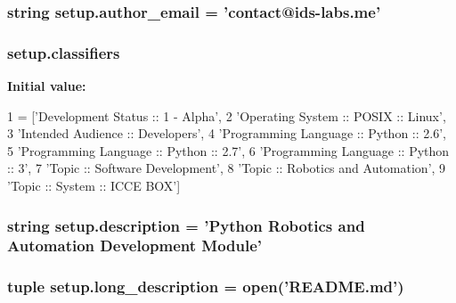\subsubsection[{author\+\_\+email}]{\setlength{\rightskip}{0pt plus 5cm}string setup.\+author\+\_\+email = 'contact@ids-\/labs.\+me'}\label{namespacesetup_aa144ac52ed417d5c65d7377e0e75673e}
\hypertarget{namespacesetup_abe96a9c38c1c61f9f0fdb002c482f785}{}
\subsubsection[{classifiers}]{\setlength{\rightskip}{0pt plus 5cm}setup.\+classifiers}\label{namespacesetup_abe96a9c38c1c61f9f0fdb002c482f785}
{\bfseries Initial value\+:}
\begin{DoxyCode}
1 = [\textcolor{stringliteral}{'Development Status :: 1 - Alpha'},
2                \textcolor{stringliteral}{'Operating System :: POSIX :: Linux'},
3                \textcolor{stringliteral}{'Intended Audience :: Developers'},
4                \textcolor{stringliteral}{'Programming Language :: Python :: 2.6'},
5                \textcolor{stringliteral}{'Programming Language :: Python :: 2.7'},
6                \textcolor{stringliteral}{'Programming Language :: Python :: 3'},
7                \textcolor{stringliteral}{'Topic :: Software Development'},
8                \textcolor{stringliteral}{'Topic :: Robotics and Automation'},
9                \textcolor{stringliteral}{'Topic :: System :: ICCE BOX'}]
\end{DoxyCode}
\hypertarget{namespacesetup_ade8aa54df2083113a10326ea2fe7934b}{}
\subsubsection[{description}]{\setlength{\rightskip}{0pt plus 5cm}string setup.\+description = 'Python Robotics and Automation Development Module'}\label{namespacesetup_ade8aa54df2083113a10326ea2fe7934b}
\hypertarget{namespacesetup_acaf26e8be236d4bfa129f4c0f4f53baf}{}
\subsubsection[{long\+\_\+description}]{\setlength{\rightskip}{0pt plus 5cm}tuple setup.\+long\+\_\+description = open('R\+E\+A\+D\+M\+E.\+md')}\label{namespacesetup_acaf26e8be236d4bfa129f4c0f4f53baf}
\hypertarget{namespacesetup_aac31bc6390743c46ed466881a9d62eb2}{}
